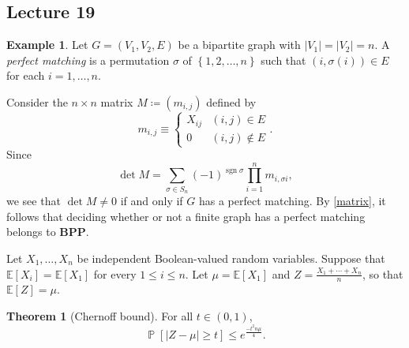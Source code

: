 \documentclass[10pt,letterpaper,cm]{nupset}
\theoremstyle{definition}
\newtheorem{exmp}[definition]{Example}
\theoremstyle{theorem}
\newtheorem{theorem}[definition]{Theorem}
\theoremstyle{remark}
\newcommand{\E}{\mathbb E}
\newcommand{\1}{\mathbf{1}}
\newcommand{\0}{\vec 0}
\DeclareMathOperator{\sgn}{sgn}
\DeclareMathOperator{\pr}{\mathbb{P}}
\begin{document}
\subsection{Lecture 19}

\begin{exmp}
Let $G=\left(V_1, V_2, E\right)$ be a bipartite graph with $\left\lvert{V_1}\right\rvert=\left\lvert{V_2}\right\rvert=n$. 
A \textit{perfect matching} is a permutation $\sigma$ of $\left\{1,2, \ldots, n\right\}$ such that $\left(i, \sigma(i)\right) \in E$ for each $i=1, \ldots, n$.

Consider the $n\times n$ matrix $M \coloneqq \left(m_{i,j}\right)$ defined by $$m_{i,j} \equiv \begin{cases} X_{ij} & (i,j) \in E\\ 0 & (i,j) \notin E    \end{cases}.$$ Since $$\det{M} =  \sum_{\sigma \in S_n} ({-1})^{\sgn{\sigma}} \prod_{i=1}^n m_{i, \sigma{i}} ,$$ we see that $\det{M} \ne 0$ if and only if $G$ has a perfect matching. By \cref{matrix}, it follows that deciding whether or not a finite graph has a perfect matching belongs to $\mathbf{BPP}$.
\end{exmp}

\medskip

Let $X_1, \ldots, X_n$ be independent Boolean-valued random variables. Suppose that $\E[X_i] = \E[X_1]$ for every $1 \leq i \leq n$. Let $ \mu = \E[X_1]$ and $Z= \frac{X_1 + \cdots + X_n}{n}$, so that $\E[Z] = \mu$. 

\begin{theorem}[Chernoff bound]\label{Chb}
 For all $t\in \left(0,1\right)$, 
 \[
 \pr\left[\left\lvert{Z - \mu}\right\rvert \geq t\right] \leq e^{\frac{{-t^2n} \mu}{4}}.
 \]
\end{theorem}
\end{document}

